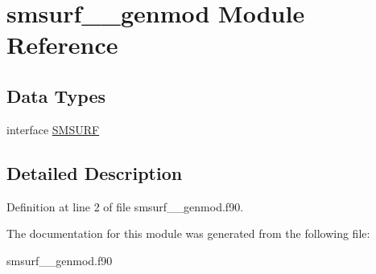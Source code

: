 \hypertarget{classsmsurf____genmod}{\section{smsurf\+\_\+\+\_\+genmod Module Reference}
\label{classsmsurf____genmod}
}
\subsection*{Data Types}
\begin{DoxyCompactItemize}
\item 
interface \hyperlink{interfacesmsurf____genmod_1_1_s_m_s_u_r_f}{S\+M\+S\+U\+R\+F}
\end{DoxyCompactItemize}


\subsection{Detailed Description}


Definition at line 2 of file smsurf\+\_\+\+\_\+genmod.\+f90.



The documentation for this module was generated from the following file\+:\begin{DoxyCompactItemize}
\item 
smsurf\+\_\+\+\_\+genmod.\+f90\end{DoxyCompactItemize}
